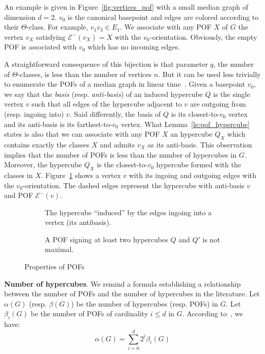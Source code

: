 \documentclass{article}
\begin{document}
An example is given in Figure~\ref{fig:vertices_pof} with a small median graph of dimension $d=2$. $v_0$ is the canonical basepoint  and edges are colored according to  their $\Theta$-class. For example, $v_1v_3 \in E_1$. We associate with any POF $X$ of $G$ the vertex $v_X$ satisfying $\mathcal{E}^-(v_X) = X$ with the $v_0$-orientation. Obviously, the empty POF is associated with $v_0$ which has no incoming edges.

A straightforward consequence of this bijection is that parameter $q$, the number of $\Theta$-classes, is less than the number of vertices $n$. But it can be used less trivially to enumerate the POFs of a median graph in linear time~\cite{BaQuSaMa02,Ko09}. Given a basepoint $v_0$, we say that the \textit{basis} (resp. \textit{anti-basis}) of an induced hypercube $Q$ is the single vertex $v$ such that all edges of the hypercube adjacent to $v$ are outgoing from (resp. ingoing into) $v$. Said differently, the basis of $Q$ is its closest-to-$v_0$ vertex and its anti-basis is its farthest-to-$v_0$ vertex. What Lemma~\ref{le:pof_hypercube} states is also that we can associate with any POF $X$ an hypercube $Q_X$ which contains exactly the classes $X$ and admits $v_X$ as its anti-basis. This observation implies that the number of POFs is less than the number of hypercubes in $G$. Moreover, the hypercube $Q_X$ is the closest-to-$v_0$ hypercube formed with the classes in $X$. Figure~\ref{subfig:ingoing_edges} shows a vertex $v$ with its ingoing and outgoing edges with the $v_0$-orientation. The dashed edges represent the hypercube with anti-basis $v$ and POF $\mathcal{E}^-(v)$.

\begin{figure}[h]
\begin{subfigure}[b]{0.49\columnwidth}
\centering
\scalebox{0.8}{}
\caption{The hypercube ``induced'' by the edges ingoing into a vertex (its antibasis).}
\label{subfig:ingoing_edges}
\end{subfigure}
\begin{subfigure}[b]{0.49\columnwidth}
\centering
\scalebox{0.8}{}
\caption{A POF signing at least two hypercubes $Q$ and $Q'$ is not maximal.}
\label{subfig:maximal_pof}
\end{subfigure}
\caption{Properties of POFs}
\label{fig:properties_pofs}
\end{figure} 

\textbf{Number of hypercubes}. We remind a formula establishing a relationship between the number of POFs and the number of hypercubes in the literature. Let $\alpha(G)$ (resp. $\beta(G)$) be the number of hypercubes (resp. POFs) in $G$. Let $\beta_i(G)$ be the number of POFs of cardinality $i \le d$ in $G$. According to~\cite{BaQuSaMa02,Ko09}, we have:
\begin{equation}
\alpha(G) = \sum_{i=0}^d 2^i\beta_i(G)
\label{eq:number_hypercubes}
\end{equation}
\end{document}

